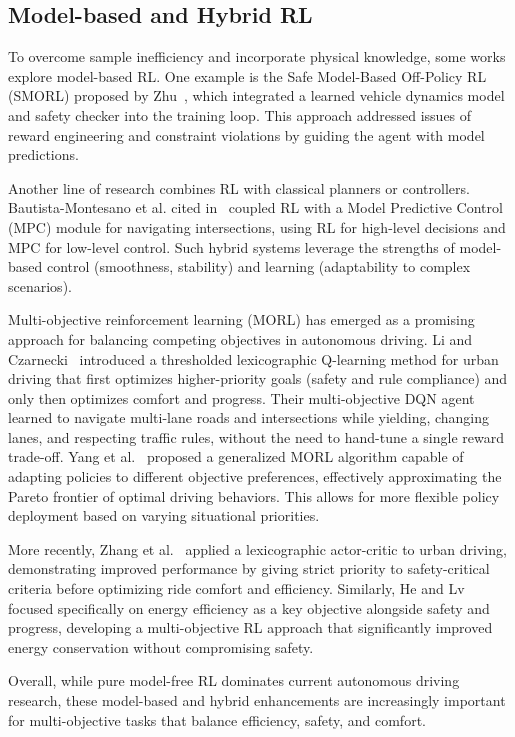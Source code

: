 \documentclass[12pt,a4paper]{article}
\begin{document}
\subsection{Model-based and Hybrid RL}
To overcome sample inefficiency and incorporate physical knowledge, some works explore model-based RL. One example is the Safe Model-Based Off-Policy RL (SMORL) proposed by Zhu~\cite{zhu2021}, which integrated a learned vehicle dynamics model and safety checker into the training loop. This approach addressed issues of reward engineering and constraint violations by guiding the agent with model predictions.

Another line of research combines RL with classical planners or controllers. Bautista-Montesano et al. cited in~\cite{survey2023} coupled RL with a Model Predictive Control (MPC) module for navigating intersections, using RL for high-level decisions and MPC for low-level control. Such hybrid systems leverage the strengths of model-based control (smoothness, stability) and learning (adaptability to complex scenarios).

Multi-objective reinforcement learning (MORL) has emerged as a promising approach for balancing competing objectives in autonomous driving. Li and Czarnecki~\cite{li2019} introduced a thresholded lexicographic Q-learning method for urban driving that first optimizes higher-priority goals (safety and rule compliance) and only then optimizes comfort and progress. Their multi-objective DQN agent learned to navigate multi-lane roads and intersections while yielding, changing lanes, and respecting traffic rules, without the need to hand-tune a single reward trade-off. Yang et al.~\cite{yang2019} proposed a generalized MORL algorithm capable of adapting policies to different objective preferences, effectively approximating the Pareto frontier of optimal driving behaviors. This allows for more flexible policy deployment based on varying situational priorities.

More recently, Zhang et al.~\cite{zhang2023} applied a lexicographic actor-critic to urban driving, demonstrating improved performance by giving strict priority to safety-critical criteria before optimizing ride comfort and efficiency. Similarly, He and Lv~\cite{he2023} focused specifically on energy efficiency as a key objective alongside safety and progress, developing a multi-objective RL approach that significantly improved energy conservation without compromising safety.

Overall, while pure model-free RL dominates current autonomous driving research, these model-based and hybrid enhancements are increasingly important for multi-objective tasks that balance efficiency, safety, and comfort.
\end{document}
